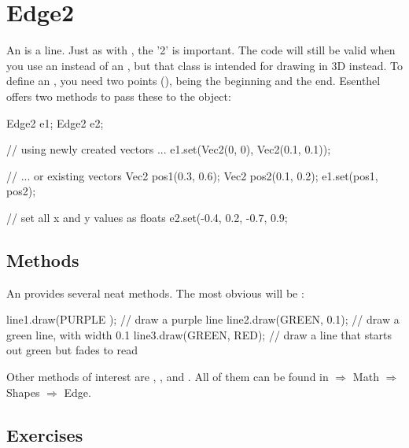 \section{Edge2}
An  is a line. Just as with , the '2' is important. The code will still be valid when you use an  instead of an , but that class is intended for drawing in 3D instead. To define an , you need two points (), being the beginning and the end. Esenthel offers two methods to pass these to the object:

\begin{code}
Edge2 e1;
Edge2 e2;

// using newly created vectors ...
e1.set(Vec2(0, 0), Vec2(0.1, 0.1));

// ... or existing vectors
Vec2 pos1(0.3, 0.6);
Vec2 pos2(0.1, 0.2);
e1.set(pos1, pos2);

// set all x and y values as floats
e2.set(-0.4, 0.2, -0.7, 0.9;
\end{code}

\subsection{Methods}
An  provides several neat methods. The most obvious will be :

\begin{code}
line1.draw(PURPLE    ); // draw a purple line
line2.draw(GREEN, 0.1); // draw a green line, with width 0.1
line3.draw(GREEN, RED); // draw a line that starts out green but fades to read
\end{code}

Other methods of interest are , ,  and . All of them can be found in $\Rightarrow$ Math $\Rightarrow$ Shapes $\Rightarrow$ Edge.

\subsection{Exercises}

